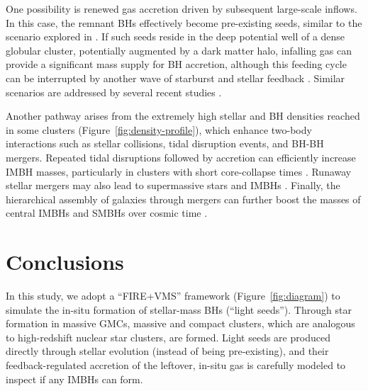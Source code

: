 \documentclass[twocolumn]{aastex631}
\begin{document}
One possibility is renewed gas accretion driven by subsequent large-scale inflows. In this case, the remnant BHs effectively become pre-existing seeds, similar to the scenario explored in \citet{ShiKremerHopkins_2024ApJ...969L..31S}. If such seeds reside in the deep potential well of a dense globular cluster, potentially augmented by a dark matter halo, infalling gas can provide a significant mass supply for BH accretion, although this feeding cycle can be interrupted by another wave of starburst and stellar feedback \citep{SunseriAndalmanTeyssier_2025arXiv251019822S}. Similar scenarios are addressed by several recent studies \citep{PartmannNaabLahen_2025MNRAS.537..956P,ReinosoLatifSchleicher_2025A&A...700A..66R,MukherjeeZhouChen_2025ApJ...981..203M}.

Another pathway arises from the extremely high stellar and BH densities reached in some clusters (Figure~\ref{fig:density-profile}), which enhance two-body interactions such as stellar collisions, tidal disruption events, and BH-BH mergers. Repeated tidal disruptions followed by accretion can efficiently increase IMBH masses, particularly in clusters with short core-collapse times \citep{RantalaNaabLahen_2024MNRAS.531.3770R}. Runaway stellar mergers may also lead to supermassive stars and IMBHs \citep{ReinosoLatifSchleicher_2025A&A...700A..66R}. Finally, the hierarchical assembly of galaxies through mergers can further boost the masses of central IMBHs and SMBHs over cosmic time \citep{KritosBeckmannSilk_2025ApJ...991...58K}.


\section{Conclusions}
\label{sec:summary}

In this study, we adopt a ``FIRE+VMS'' framework (Figure~\ref{fig:diagram}) to simulate the in-situ formation of stellar-mass BHs (``light seeds''). Through star formation in massive GMCs, massive and compact clusters, which are analogous to high-redshift nuclear star clusters, are formed. Light seeds are produced directly through stellar evolution (instead of being pre-existing), and their feedback-regulated accretion of the leftover, in-situ gas is carefully modeled to inspect if any IMBHs can form. 
\end{document}
